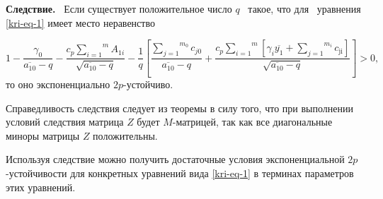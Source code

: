 \textbf{Следствие.} \ Если существует положительное число  $q$ \ такое, что для \ уравнения \eqref{kri-eq-1} имеет место
неравенство

\begin{equation}\label{kri-eq-14}
	1-\frac{\gamma _0}{\overline{a_{10}}-q}-\frac{c_p\overset m{\underset{i=1}{\sum
		}}A_{1i}}{\sqrt{\overline{a_{10}}-q}}-\frac 1 q\left[\frac{\overset{m_0}{\underset{j=1}{\sum
		}}c_{\mathit{j0}}}{\overline{a_{10}}-q}+\frac{c_p\overset m{\underset{i=1}{\sum }}\left[\gamma
		_i\overline{y_1}+\overset{m_i}{\underset{j=1}{\sum
		}}c_{\text{ji}}\right]}{\sqrt{\overline{a_{10}}-q}}\right]>0,
\end{equation}
то оно экспоненциально  $2p${}-устойчиво.

Справедливость следствия следует из теоремы в силу того, что при выполнении условий следствия матрица  $Z$
будет  $M${}-матрицей, так как все диагональные миноры матрицы  $Z$
положительны.

Используя следствие можно получить достаточные условия экспоненциальной  $2p$-\linebreak устойчивости для конкретных уравнений
вида \eqref{kri-eq-1} в терминах параметров этих уравнений. 